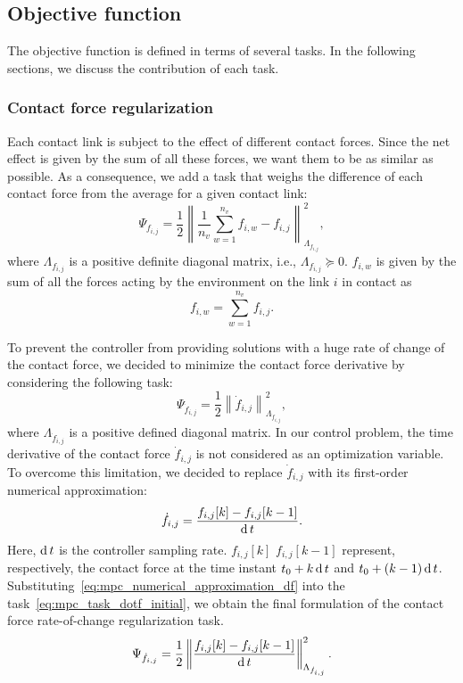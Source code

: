 \subsection{Objective function \label{sec:mpc_tasks_formulation}}
The objective function is defined in terms of several tasks. In the following sections, we discuss the contribution of each task.

\subsubsection{Contact force regularization}

Each contact link is subject to the effect of different contact forces. Since the net effect is given by the sum of all these forces, we want them to be as similar as possible. As a consequence, we add a task that weighs the difference of each contact force from the average for a given contact link:
\begin{equation}
    \Psi_{f_{i,j}} = \frac{1}{2} \left\| \frac{1}{n_v}\sum_{w = 1}^{n_v} f_{i,w} - f_{i,j} \right\|^2_{\Lambda_{f_{i,j}}},
\end{equation}
where $\Lambda_{f_{i,j}}$ is a positive definite diagonal matrix, i.e., $\Lambda_{f_{i,j}} \succeq 0$. $f_{i,w}$ is given by the sum of all the forces acting by the environment on the link $i$ in contact as
\begin{equation}
    f_{i,w} = \sum_{w = 1}^{n_v} f_{i,j}.
\end{equation}
\par
To prevent the controller from providing solutions with a huge rate of change of the contact force, we decided to minimize the contact force derivative by considering the following task:
\begin{equation}
    \label{eq:mpc_task_dotf_initial}
    \Psi_{\dot{f}_{i,j}} = \frac{1}{2} \left\|  \dot{f}_{i,j} \right\|^2_{\Lambda_{\dot{f}_{i,j}}},
\end{equation}
where $\Lambda_{\dot{f}_{i,j}}$ is a positive defined diagonal matrix.
In our control problem, the time derivative of the contact force $\dot{f}_{i,j}$ is not considered as an optimization variable. To overcome this limitation, we decided to replace $\dot{f}_{i,j}$ with its first-order numerical approximation:
\begin{equation}
    \label{eq:mpc_numerical_approximation_df}
    \dot{f}_{i,j} = \frac{f_{i,j}[k] - {f}_{i,j}[k-1]  }{\operatorname{d} t}.
\end{equation}
Here, $\operatorname{d} t$ is the controller sampling rate. $f_{i,j}[k]$ ${f}_{i,j}[k-1]$ represent, respectively, the contact force at the time instant $t_0 + k \operatorname{d} t$ and $t_0 + (k-1) \operatorname{d} t$.
Substituting~\eqref{eq:mpc_numerical_approximation_df} into the task~\eqref{eq:mpc_task_dotf_initial}, we obtain the final formulation of the contact force rate-of-change regularization task.
\begin{equation}
    \label{eq:mpc_task_dotf}
    \Psi_{\dot{f}_{i,j}} = \frac{1}{2} \left\lVert\frac{f_{i,j}[k] - {f}_{i,j}[k-1]  }{\operatorname{d} t}\right\rVert^2_{\Lambda_{\dot{f}_{i,j}}}.
\end{equation}


